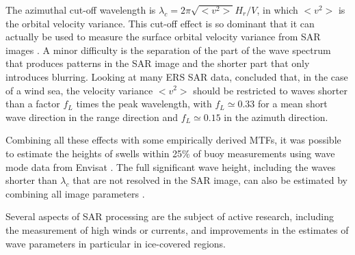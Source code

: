 The azimuthal cut-off wavelength is $\lambda_c =  2 \pi \sqrt{<v^2>} H_r/V$, in which $<v^2>$ is the orbital velocity variance.  This cut-off effect is so dominant that it can 
actually be used to measure the surface orbital velocity variance from SAR images \citep{Stopa&al.2016}. A minor difficulty is the separation of the part of the wave spectrum that 
produces patterns in the SAR image and the shorter part that only introduces blurring. Looking at many ERS SAR data, \cite{Kerbaol1997} concluded that, in the case 
of a wind sea, the velocity variance $<v^2>$  should be restricted to waves shorter than a factor $f_L$ times the peak wavelength, with $f_L \simeq 0.33$ for a mean short wave direction 
in the range direction and  $f_L \simeq 0.15$ in the azimuth direction.  

Combining all these effects with some empirically derived MTFs, it was possible to estimate the heights of swells within 25\% of buoy measurements using 
wave mode data from Envisat \citep{Collard&al.2009}. The full significant wave height, including the waves shorter than $\lambda_c$ that are not resolved in the 
SAR image, can also be estimated by combining all image parameters \citep{Li&al.2011}. 






Several aspects of SAR processing are the subject of active research, including the measurement of high winds or currents, and improvements in the estimates of wave 
parameters in particular in ice-covered regions. 

 
